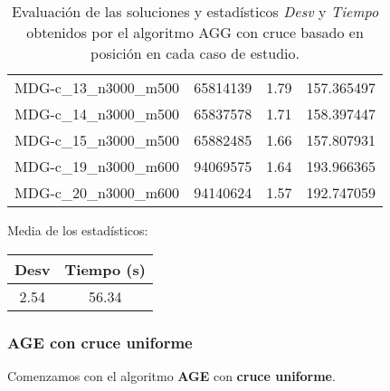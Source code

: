 \documentclass{article}
\begin{document}
\begin{table}[H]
\begin{tabular}{|cccc|}
		MDG-c\_13\_n3000\_m500 & 65814139 & 1.79 & 157.365497\\
		MDG-c\_14\_n3000\_m500 & 65837578 & 1.71 & 158.397447\\
		MDG-c\_15\_n3000\_m500 & 65882485 & 1.66 & 157.807931\\
		MDG-c\_19\_n3000\_m600 & 94069575 & 1.64 & 193.966365\\
		MDG-c\_20\_n3000\_m600 & 94140624 & 1.57 & 192.747059\\
		\hline
	\end{tabular}
	\caption{Evaluación de las soluciones y estadísticos \emph{Desv} y \emph{Tiempo} obtenidos por el algoritmo AGG con cruce basado en posición
		en cada caso de estudio.}
	\label{tab:agg-posicion}
\end{table}

Media de los estadísticos:
\begin{table}[H]
	\centering
	\begin{tabular}{|cc|}
		\hline
		Desv & Tiempo (s)\\ \hline
		2.54 & 56.34 \\
		\hline
	\end{tabular}
\end{table}

\pagebreak

\subsubsection*{AGE con cruce uniforme}

Comenzamos con el algoritmo \textbf{AGE} con \textbf{cruce uniforme}.
\end{document}
